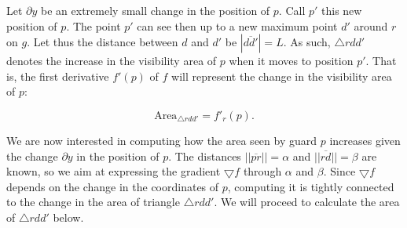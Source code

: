 Let $\partial y$ be an extremely small change in the position of $p$. Call $p'$ this new position of $p$. The point $p'$ can see then up to a new maximum point $d'$ around $r$ on $g$. Let thus the distance between $d$ and $d'$ be $|\overline{dd'}| = L$. As such, $\triangle rdd'$ denotes the increase in the visibility area of $p$ when it moves to position $p'$. That is, the first derivative $f'(p)$ of $f$ will represent the change in the visibility area of $p$:

\begin{equation}
    \text{Area}_{\triangle rdd'} = f'_r(p). \label{eq:derivative}
\end{equation}








We are now interested in computing how the area seen by guard $p$ increases given the change $\partial y$ in the position of $p$. The distances $||\overline{pr}|| = \alpha$ and $||\overline{rd}|| = \beta$ are known, so we aim at expressing the gradient $\bigtriangledown f$ through $\alpha$ and $\beta$. Since $\bigtriangledown f$ depends on the change in the coordinates of $p$, computing it is tightly connected to the change in the area of triangle $\triangle rdd'$. We will proceed to calculate the area of $\triangle rdd'$ below.

